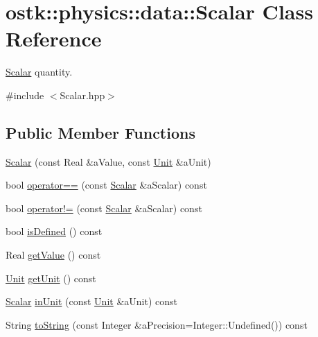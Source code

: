 \hypertarget{classostk_1_1physics_1_1data_1_1_scalar}{}\section{ostk\+:\+:physics\+:\+:data\+:\+:Scalar Class Reference}
\label{classostk_1_1physics_1_1data_1_1_scalar}


\hyperlink{classostk_1_1physics_1_1data_1_1_scalar}{Scalar} quantity.  




{\ttfamily \#include $<$Scalar.\+hpp$>$}

\subsection*{Public Member Functions}
\begin{DoxyCompactItemize}
\item 
\hyperlink{classostk_1_1physics_1_1data_1_1_scalar_a9c81732bf949003d9a613680d183c3af}{Scalar} (const Real \&a\+Value, const \hyperlink{classostk_1_1physics_1_1_unit}{Unit} \&a\+Unit)
\item 
bool \hyperlink{classostk_1_1physics_1_1data_1_1_scalar_a92a4f3e75436e61c077c6d8b37198e95}{operator==} (const \hyperlink{classostk_1_1physics_1_1data_1_1_scalar}{Scalar} \&a\+Scalar) const
\item 
bool \hyperlink{classostk_1_1physics_1_1data_1_1_scalar_a9d1f401cb3df5a6621c1fc04d86ce423}{operator!=} (const \hyperlink{classostk_1_1physics_1_1data_1_1_scalar}{Scalar} \&a\+Scalar) const
\item 
bool \hyperlink{classostk_1_1physics_1_1data_1_1_scalar_a93ea853416cca1007c462ffafdd4aa95}{is\+Defined} () const
\item 
Real \hyperlink{classostk_1_1physics_1_1data_1_1_scalar_ab632ef637308f3b97f0ab4ef63780e54}{get\+Value} () const
\item 
\hyperlink{classostk_1_1physics_1_1_unit}{Unit} \hyperlink{classostk_1_1physics_1_1data_1_1_scalar_af2bf59b6c0681b8770083006328ecdd5}{get\+Unit} () const
\item 
\hyperlink{classostk_1_1physics_1_1data_1_1_scalar}{Scalar} \hyperlink{classostk_1_1physics_1_1data_1_1_scalar_abe53604aa68b58737d7ffbf039a018f3}{in\+Unit} (const \hyperlink{classostk_1_1physics_1_1_unit}{Unit} \&a\+Unit) const
\item 
String \hyperlink{classostk_1_1physics_1_1data_1_1_scalar_acc184e1d5fa8e7868fcb67e065e68b77}{to\+String} (const Integer \&a\+Precision=Integer\+::\+Undefined()) const
\end{DoxyCompactItemize}

